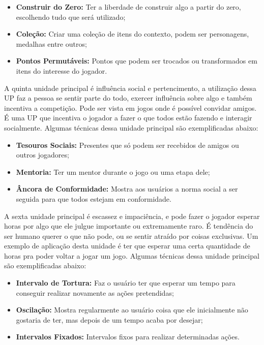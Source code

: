 \begin{itemize}
\item  \textbf{Construir do Zero:} Ter a liberdade de construir algo a partir do zero, escolhendo tudo que será utilizado;
\item  \textbf{Coleção:} Criar uma coleção de itens do contexto, podem ser personagens, medalhas entre outros;
\item  \textbf{Pontos Permutáveis:} Pontos que podem ser trocados ou transformados em itens do interesse do jogador.
\end{itemize}

A quinta unidade principal é influência social e pertencimento, a utilização dessa UP faz a pessoa se sentir parte do todo, exercer influência sobre algo e também incentiva a competição. Pode ser vista em jogos onde é possível convidar amigos. É uma UP que incentiva o jogador a fazer o que todos estão fazendo e interagir socialmente. Algumas técnicas dessa unidade principal são exemplificadas abaixo:

\begin{itemize}
\item  \textbf{Tesouros Sociais:} Presentes que só podem ser recebidos de amigos ou outros jogadores;
\item  \textbf{Mentoria:} Ter um mentor durante o jogo ou uma etapa dele;
\item  \textbf{Âncora de Conformidade:} Mostra aos usuários a norma social a ser seguida para que todos estejam em conformidade.
\end{itemize}

A sexta unidade principal é escassez e impaciência, e pode fazer o jogador esperar horas por algo que ele julgue importante ou extremamente raro. É tendência do ser humano querer o que não pode, ou se sentir atraído por coisas exclusivas. Um exemplo de aplicação desta unidade é ter que esperar uma certa quantidade de horas pra poder voltar a jogar um jogo. Algumas técnicas dessa unidade principal são exemplificadas abaixo:

\begin{itemize}
\item  \textbf{Intervalo de Tortura:} Faz o usuário ter que esperar um tempo para conseguir realizar novamente as ações pretendidas;
\item  \textbf{Oscilação:} Mostra regularmente ao usuário coisa que ele inicialmente não gostaria de ter, mas depois de um tempo acaba por desejar;
\item  \textbf{Intervalos Fixados:} Intervalos fixos para realizar determinadas ações.
\end{itemize}

